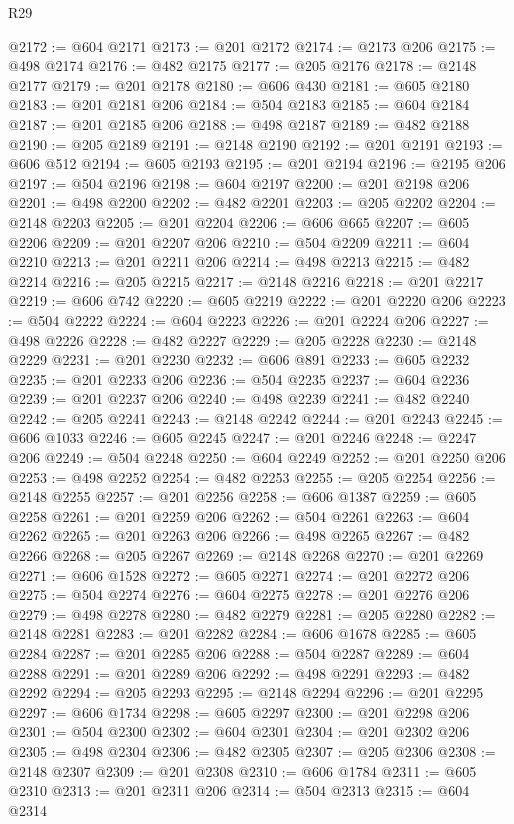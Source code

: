 \begin{lexlean}{R29}
\begin{coremodule}
@2172 := @604 @2171
@2173 := @201 @2172
@2174 := @2173 @206
@2175 := @498 @2174
@2176 := @482 @2175
@2177 := @205 @2176
@2178 := @2148 @2177
@2179 := @201 @2178
@2180 := @606 @430
@2181 := @605 @2180
@2183 := @201 @2181 @206
@2184 := @504 @2183
@2185 := @604 @2184
@2187 := @201 @2185 @206
@2188 := @498 @2187
@2189 := @482 @2188
@2190 := @205 @2189
@2191 := @2148 @2190
@2192 := @201 @2191
@2193 := @606 @512
@2194 := @605 @2193
@2195 := @201 @2194
@2196 := @2195 @206
@2197 := @504 @2196
@2198 := @604 @2197
@2200 := @201 @2198 @206
@2201 := @498 @2200
@2202 := @482 @2201
@2203 := @205 @2202
@2204 := @2148 @2203
@2205 := @201 @2204
@2206 := @606 @665
@2207 := @605 @2206
@2209 := @201 @2207 @206
@2210 := @504 @2209
@2211 := @604 @2210
@2213 := @201 @2211 @206
@2214 := @498 @2213
@2215 := @482 @2214
@2216 := @205 @2215
@2217 := @2148 @2216
@2218 := @201 @2217
@2219 := @606 @742
@2220 := @605 @2219
@2222 := @201 @2220 @206
@2223 := @504 @2222
@2224 := @604 @2223
@2226 := @201 @2224 @206
@2227 := @498 @2226
@2228 := @482 @2227
@2229 := @205 @2228
@2230 := @2148 @2229
@2231 := @201 @2230
@2232 := @606 @891
@2233 := @605 @2232
@2235 := @201 @2233 @206
@2236 := @504 @2235
@2237 := @604 @2236
@2239 := @201 @2237 @206
@2240 := @498 @2239
@2241 := @482 @2240
@2242 := @205 @2241
@2243 := @2148 @2242
@2244 := @201 @2243
@2245 := @606 @1033
@2246 := @605 @2245
@2247 := @201 @2246
@2248 := @2247 @206
@2249 := @504 @2248
@2250 := @604 @2249
@2252 := @201 @2250 @206
@2253 := @498 @2252
@2254 := @482 @2253
@2255 := @205 @2254
@2256 := @2148 @2255
@2257 := @201 @2256
@2258 := @606 @1387
@2259 := @605 @2258
@2261 := @201 @2259 @206
@2262 := @504 @2261
@2263 := @604 @2262
@2265 := @201 @2263 @206
@2266 := @498 @2265
@2267 := @482 @2266
@2268 := @205 @2267
@2269 := @2148 @2268
@2270 := @201 @2269
@2271 := @606 @1528
@2272 := @605 @2271
@2274 := @201 @2272 @206
@2275 := @504 @2274
@2276 := @604 @2275
@2278 := @201 @2276 @206
@2279 := @498 @2278
@2280 := @482 @2279
@2281 := @205 @2280
@2282 := @2148 @2281
@2283 := @201 @2282
@2284 := @606 @1678
@2285 := @605 @2284
@2287 := @201 @2285 @206
@2288 := @504 @2287
@2289 := @604 @2288
@2291 := @201 @2289 @206
@2292 := @498 @2291
@2293 := @482 @2292
@2294 := @205 @2293
@2295 := @2148 @2294
@2296 := @201 @2295
@2297 := @606 @1734
@2298 := @605 @2297
@2300 := @201 @2298 @206
@2301 := @504 @2300
@2302 := @604 @2301
@2304 := @201 @2302 @206
@2305 := @498 @2304
@2306 := @482 @2305
@2307 := @205 @2306
@2308 := @2148 @2307
@2309 := @201 @2308
@2310 := @606 @1784
@2311 := @605 @2310
@2313 := @201 @2311 @206
@2314 := @504 @2313
@2315 := @604 @2314

\end{coremodule}
\end{lexlean}
